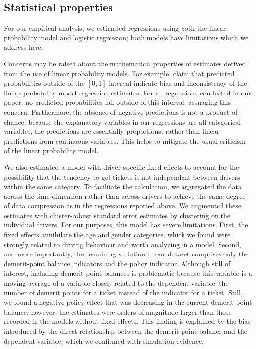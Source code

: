 \documentclass{cje}
\begin{document}
\subsection{Statistical properties}

For our empirical analysis, we estimated regressions using
both the linear probability model
and logistic regression; both models have limitations
which we address here. 

Concerns may be raised about the mathematical properties of estimates 
derived from the use of linear probability models. 
For example, 
\citet{horraceoaxaca2006}
claim that predicted probabilities outside of the $[0,1]$ interval 
indicate bias and inconsistency of the linear probability model regression estimates. 
For all regressions conducted in our paper, 
no predicted probabilities fall outside of this interval, 
assuaging this concern. 
Furthermore, the absence of negative predictions is not a product of chance: 
because the explanatory variables in our regressions are all categorical variables, 
the predictions are essentially proportions, 
rather than linear predictions from continuous variables. 
This helps to mitigate the usual criticism of the linear probability model. 

We also estimated a model with driver-specific fixed effects
to account for the possibility that the tendency to get tickets
is not independent between drivers within the same category. 
To facilitate the calculation, we aggregated the data across the time dimension
rather than across drivers
to achieve the same degree of data compression as in the regressions reported above.
We augmented these estimates with cluster-robust standard error estimates 
by clustering on the individual drivers. 
For our purposes, this model has severe limitations. 
First, the fixed effects annihilate the age and gender categories, 
which we found were strongly related to driving behaviour
and worth analyzing in a model. 
Second, and more importantly, 
the remaining variation in our dataset comprises 
only the demerit-point balance indicators and the policy indicator. 
Although still of interest, including demerit-point balances is problematic because 
this variable is a moving average of a variable closely related to the dependent variable:
the number of demerit points for a ticket instead of the indicator for a ticket. 
Still, we found a negative policy effect that was decreasing 
in the current demerit-point balance;
however, the estimates were orders of magnitude larger 
than those recorded in the models without fixed effects. 
This finding is explained by the bias introduced by the direct relationship between the demerit-point balance and the dependent variable, 
which we confirmed with simulation evidence. 
\end{document}
